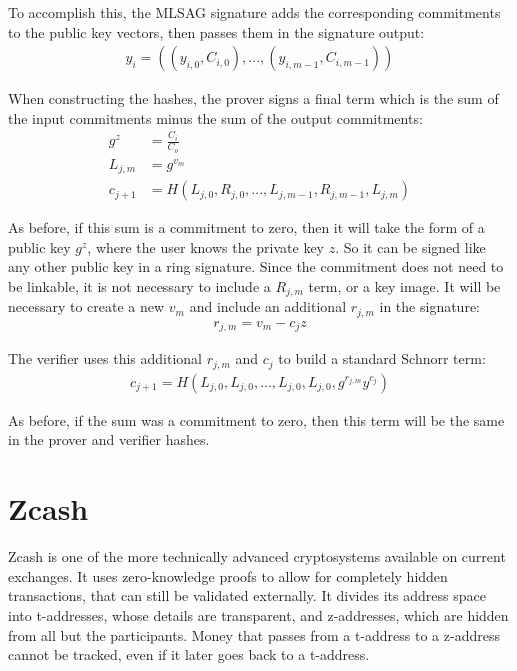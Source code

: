 \documentclass{article}
\begin{document}
To accomplish this, the MLSAG signature adds the corresponding commitments to the public key vectors, then passes them in the signature output:
\begin{align}
  y_i = ((y_{i,0}, C_{i,0}), ..., (y_{i,m-1}, C_{i,m-1}))
\end{align}

When constructing the hashes, the prover signs a final term which is the sum of the input commitments minus the sum of the output commitments:
\begin{align}
  g^z &= \frac{C_i}{C_o}\\
  L_{j,m} &= g^{v_m}\\
  c_{j+1} &= H(L_{j,0}, R_{j,0}, ... , L_{j,m-1}, R_{j, m-1}, L_{j,m})
\end{align}

As before, if this sum is a commitment to zero, then it will take the form of a public key $g^z$, where the user knows the private key $z$.  So it can be signed like any other public key in a ring signature.  Since the commitment does not need to be linkable, it is not necessary to include a $R_{j,m}$ term, or a key image.  It will be necessary to create a new $v_m$ and include an additional $r_{j,m}$ in the signature:
\begin{align}
  r_{j,m} = v_m - c_j z
\end{align}

The verifier uses this additional $r_{j,m}$ and $c_j$ to build a standard Schnorr term:
\begin{align}
  c_{j+1} = H(L_{j,0}, L_{j,0}, ... , L_{j,0}, L_{j,0}, g^{r_{j,m}} y^{c_j})
\end{align}

As before, if the sum was a commitment to zero, then this term will be the same in the prover and verifier hashes.



\section{Zcash}

Zcash is one of the more technically advanced cryptosystems available on current exchanges.  It uses zero-knowledge proofs to allow for completely hidden transactions, that can still be validated externally.  It divides its address space into t-addresses, whose details are transparent, and z-addresses, which are hidden from all but the participants.  Money that passes from a t-address to a z-address cannot be tracked, even if it later goes back to a t-address.
\end{document}
